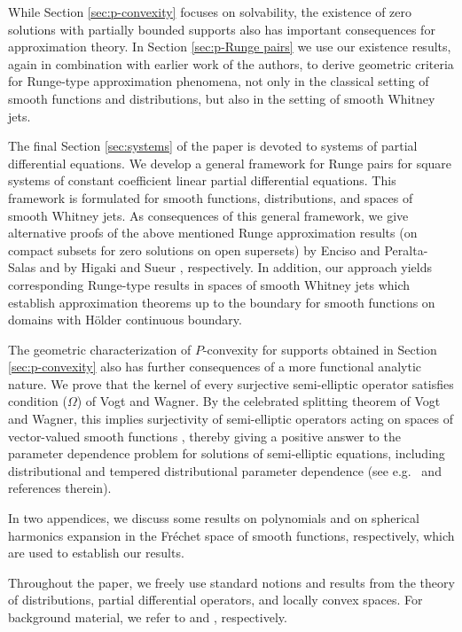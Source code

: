 \documentclass[a4paper,10pt]{amsart}
\newtheorem*{crucial lemma}{Lemma \ref{lem:nice polynomial2}}
\theoremstyle{definition}
\begin{document}
While Section \ref{sec:p-convexity} focuses on solvability, the existence of zero solutions with partially bounded supports also has important consequences for approximation theory. In Section \ref{sec:p-Runge pairs} we use our existence results, again in combination with earlier work of the authors, to derive geometric criteria for Runge-type approximation phenomena, not only in the classical setting of smooth functions and distributions, but also in the setting of smooth Whitney jets.

The final Section \ref{sec:systems} of the paper is devoted to systems of partial differential equations. We develop a general framework for Runge pairs for square systems of constant coefficient linear partial differential equations. This framework is formulated for smooth functions, distributions, and spaces of smooth Whitney jets. As consequences of this general framework, we give alternative proofs of the above mentioned Runge approximation results (on compact subsets for zero solutions on open supersets) by Enciso and Peralta-Salas \cite{EnPe15} and by Higaki and Sueur \cite{HiSu25}, respectively. In addition, our approach yields corresponding Runge-type results in spaces of smooth Whitney jets which establish approximation theorems up to the boundary for smooth functions on domains with H\"older continuous boundary.

The geometric characterization of $P$-convexity for supports obtained in Section \ref{sec:p-convexity} also has further consequences of a more functional analytic nature. We prove that the kernel of every surjective semi-elliptic operator satisfies condition ($\Omega$) of Vogt and Wagner. By the celebrated splitting theorem of Vogt and Wagner, this implies surjectivity of semi-elliptic operators acting on spaces of vector-valued smooth functions \cite{Vogt1983}, thereby giving a positive answer to the parameter dependence problem for solutions of semi-elliptic equations, including distributional and tempered distributional parameter dependence (see e.g.~\cite{BonetDomanski06} and references therein).

In two appendices, we discuss some results on polynomials and on spherical harmonics expansion in the Fr\'echet space of smooth functions, respectively, which are used to establish our results.

Throughout the paper, we freely use standard notions and results from the theory of distributions, partial differential operators, and locally convex spaces. For background material, we refer to \cite{Hor1,Hor2,Treves1966} and \cite{Jarchow1981,MeV}, respectively.
\end{document}
